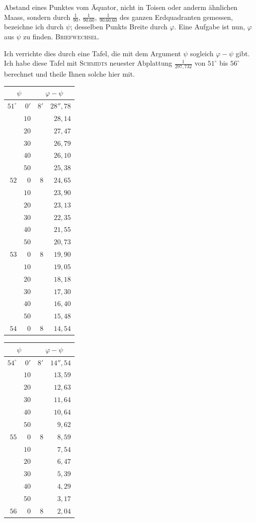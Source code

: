 Abstand eines Punktes vom Äquator, nicht in Toisen oder anderm ähnlichen Maass, sondern durch $\frac1{90}$, $\frac1{90.60}$, $\frac1{90.60.60}$ des ganzen Erdquadranten gemessen, bezeichne ich durch $\psi$; desselben Punkts Breite durch $\varphi$. Eine Aufgabe ist nun, $\varphi$ aus $\psi$ zu finden.
\clearpage
{}\hfill\textsc{Briefwechsel.}\hfill\mbox{}\par\medskip
Ich verrichte dies durch eine Tafel, die mit dem Argument $\psi$ sogleich $\varphi-\psi$ gibt. Ich habe diese Tafel mit \textsc{Schmidts} neuester Abplattung $\frac1{297{,}732}$ von $51^\circ$ bis $56^\circ$ berechnet und theile Ihnen solche hier mit.
\begin{center}
\renewcommand{\arraystretch}{1.07}
\begin{tabular}[t]{|r@{\;}r|r@{\;}r|}
\hline
\multicolumn{2}{|c|}{$\psi$}&\multicolumn{2}{c|}{$\varphi-\psi$}\\\hline\hline
$51^\circ$&$0'$&$8'$&$28''{,}78$\\\hline
&$10$&&$28{,}14$\\
&$20$&&$27{,}47$\\
&$30$&&$26{,}79$\\
&$40$&&$26{,}10$\\
&$50$&&$25{,}38$\\
$52$&$0$&$8$&$24{,}65$\\\hline
&$10$&&$23{,}90$\\
&$20$&&$23{,}13$\\
&$30$&&$22{,}35$\\
&$40$&&$21{,}55$\\
&$50$&&$20{,}73$\\
$53$&$0$&$8$&$19{,}90$\\\hline
&$10$&&$19{,}05$\\
&$20$&&$18{,}18$\\
&$30$&&$17{,}30$\\
&$40$&&$16{,}40$\\
&$50$&&$15{,}48$\\
$54$&$0$&$8$&$14{,}54$
\end{tabular}
\hspace{2cm}
\begin{tabular}[t]{|r@{\;}r|r@{\;}r|}
\hline
\multicolumn{2}{|c|}{$\psi$}&\multicolumn{2}{c|}{$\varphi-\psi$}\\\hline\hline
$54^\circ$&$0'$&$8'$&$14''{,}54$\\\hline
&$10$&&$13{,}59$\\
&$20$&&$12{,}63$\\
&$30$&&$11{,}64$\\
&$40$&&$10{,}64$\\
&$50$&&$9{,}62$\\
$55$&$0$&$8$&$8{,}59$\\\hline
&$10$&&$7{,}54$\\
&$20$&&$6{,}47$\\
&$30$&&$5{,}39$\\
&$40$&&$4{,}29$\\
&$50$&&$3{,}17$\\
$56$&$0$&$8$&$2{,}04$
\end{tabular}
\end{center}
